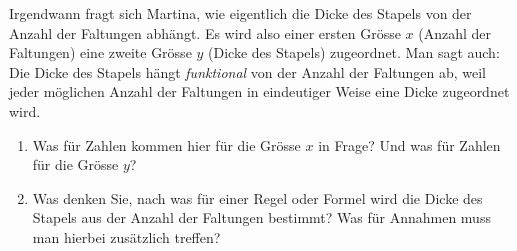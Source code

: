 \begin{enumerate}
          Irgendwann fragt sich Martina, wie eigentlich die Dicke des Stapels von der Anzahl der Faltungen abhängt. Es wird also einer ersten Grösse $x$ (Anzahl der Faltungen) eine zweite Grösse $y$ (Dicke des Stapels) zugeordnet. Man sagt auch: Die Dicke des Stapels hängt \emph{funktional} von der Anzahl der Faltungen ab, weil jeder möglichen Anzahl der Faltungen in eindeutiger Weise eine Dicke zugeordnet wird.

          \begin{enumerate}
              \item Was für Zahlen kommen hier für die Grösse $x$ in Frage? Und was für Zahlen für die Grösse $y$?

              \item Was denken Sie, nach was für einer Regel oder Formel wird die Dicke des Stapels aus der Anzahl der Faltungen bestimmt? Was für Annahmen muss man hierbei zusätzlich treffen?
          \end{enumerate}
\end{enumerate}

\newpage
